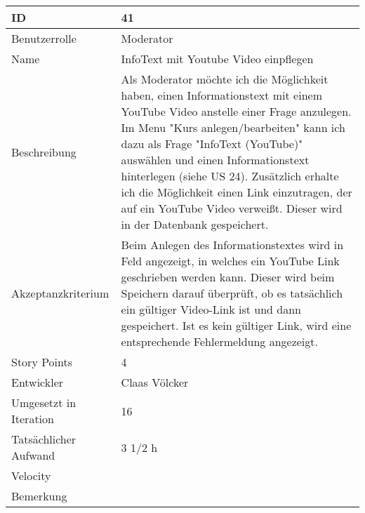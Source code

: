 \begin{tabularx}{\textwidth}{|p{}|X|}
	\hline
	ID & 41\\
	\hline
	Benutzerrolle & Moderator\\
	\hline
	Name & InfoText mit Youtube Video einpflegen\\
	\hline
	Beschreibung & Als Moderator möchte ich die Möglichkeit haben, einen Informationstext mit einem YouTube Video anstelle einer Frage anzulegen. Im Menu "Kurs anlegen/bearbeiten" kann ich dazu als Frage "InfoText (YouTube)" auswählen und einen Informationstext hinterlegen (siehe US 24). Zusätzlich erhalte ich die Möglichkeit einen Link einzutragen, der auf ein YouTube Video verweißt. Dieser wird in der Datenbank gespeichert.\\
	\hline
	Akzeptanzkriterium & Beim Anlegen des Informationstextes wird in Feld angezeigt, in welches ein YouTube Link geschrieben werden kann. Dieser wird beim Speichern darauf überprüft, ob es tatsächlich ein gültiger Video-Link ist und dann gespeichert. Ist es kein gültiger Link, wird eine entsprechende Fehlermeldung angezeigt. \\
	\hline
	Story Points & 4\\
	\hline
	Entwickler & Claas Völcker\\
	\hline
	Umgesetzt in Iteration & 16\\
	\hline
	Tatsächlicher Aufwand & 3 1/2 h\\
	\hline
	Velocity & \\
	\hline
	Bemerkung & \\
	\hline
\end{tabularx}
\vspace{20pt}

